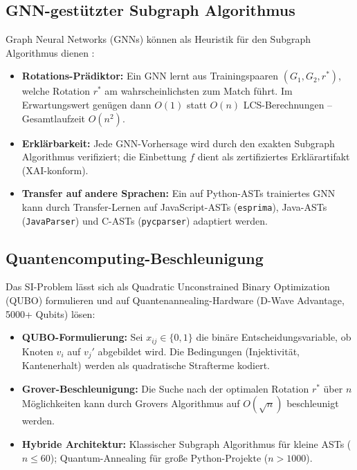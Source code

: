 ﻿\documentclass[a4paper,12pt]{article}
\theoremstyle{definition}
\begin{document}
\subsection{GNN-gest\"utzter Subgraph Algorithmus}

Graph Neural Networks (GNNs) k\"onnen als Heuristik f\"ur den
Subgraph Algorithmus dienen \cite{hamilton2020}:
\begin{itemize}
    \item \textbf{Rotations-Pr\"adiktor:} Ein GNN lernt aus
          Trainingspaaren $(G_1, G_2, r^*)$, welche Rotation
          $r^*$ am wahrscheinlichsten zum Match f\"uhrt.  Im
          Erwartungswert gen\"ugen dann $O(1)$ statt $O(n)$
          LCS-Berechnungen -- Gesamtlaufzeit $O(n^2)$.
    \item \textbf{Erkl\"arbarkeit:} Jede GNN-Vorhersage wird
          durch den exakten Subgraph Algorithmus verifiziert;
          die Einbettung $f$ dient als zertifiziertes Erkl\"ar\-artif\-akt
          (XAI-konform).
    \item \textbf{Transfer auf andere Sprachen:} Ein auf
          Python-ASTs trainiertes GNN kann durch Transfer-Lernen
          auf JavaScript-ASTs (\texttt{esprima}),
          Java-ASTs (\texttt{JavaParser}) und C-ASTs
          (\texttt{pycparser}) adaptiert werden.
\end{itemize}

\subsection{Quantencomputing-Beschleunigung}

Das SI-Problem l\"asst sich als Quadratic Unconstrained Binary
Optimization (QUBO) formulieren und auf Quantenannealing-Hardware
(D-Wave Advantage, 5000+ Qubits) l\"osen:
\begin{itemize}
    \item \textbf{QUBO-Formulierung:} Sei $x_{ij} \in \{0,1\}$
          die bin\"are Entscheidungsvariable, ob Knoten $v_i$
          auf $v_j'$ abgebildet wird.  Die Bedingungen
          (Injektivit\"at, Kantenerhalt) werden als quadratische
          Strafterme kodiert.
    \item \textbf{Grover-Beschleunigung:} Die Suche nach der
          optimalen Rotation $r^*$ \"uber $n$ M\"oglichkeiten
          kann durch Grovers Algorithmus auf $O(\sqrt{n})$
          beschleunigt werden.
    \item \textbf{Hybride Architektur:} Klassischer Subgraph
          Algorithmus f\"ur kleine ASTs ($n \leq 60$);
          Quantum-Annealing f\"ur gro{\ss}e Python-Projekte
          ($n > 1000$).
\end{itemize}
\end{document}
